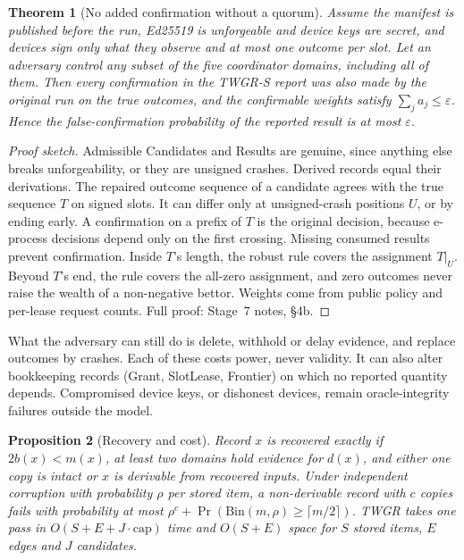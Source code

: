 \documentclass[11pt]{article}
\newtheorem{theorem}{Theorem}
\newtheorem{proposition}[theorem]{Proposition}
\theoremstyle{definition}
\begin{document}
\begin{theorem}[No added confirmation without a quorum]\label{thm:twgrs}
Assume the manifest is published before the run, Ed25519 is unforgeable and device keys are secret, and devices sign only what they observe and at most one outcome per slot. Let an adversary control any subset of the five coordinator domains, including all of them. Then every confirmation in the TWGR-S report was also made by the original run on the true outcomes, and the confirmable weights satisfy $\sum_j a_j\le\varepsilon$. Hence the false-confirmation probability of the reported result is at most $\varepsilon$.
\end{theorem}
\begin{proof}[Proof sketch]
Admissible Candidates and Results are genuine, since anything else breaks unforgeability, or they are unsigned crashes. Derived records equal their derivations. The repaired outcome sequence of a candidate agrees with the true sequence $T$ on signed slots. It can differ only at unsigned-crash positions $U$, or by ending early. A confirmation on a prefix of $T$ is the original decision, because e-process decisions depend only on the first crossing. Missing consumed results prevent confirmation. Inside $T$'s length, the robust rule covers the assignment $T|_U$. Beyond $T$'s end, the rule covers the all-zero assignment, and zero outcomes never raise the wealth of a non-negative bettor. Weights come from public policy and per-lease request counts. Full proof: Stage~7 notes, \S4b.
\end{proof}

What the adversary can still do is delete, withhold or delay evidence, and replace outcomes by crashes. Each of these costs power, never validity. It can also alter bookkeeping records (Grant, SlotLease, Frontier) on which no reported quantity depends. Compromised device keys, or dishonest devices, remain oracle-integrity failures outside the model.

\begin{proposition}[Recovery and cost]\label{prop:recovery}
Record $x$ is recovered exactly if $2b(x)<m(x)$, at least two domains hold evidence for $d(x)$, and either one copy is intact or $x$ is derivable from recovered inputs. Under independent corruption with probability $\rho$ per stored item, a non-derivable record with $c$ copies fails with probability at most $\rho^{c}+\Pr(\mathrm{Bin}(m,\rho)\ge\lceil m/2\rceil)$. TWGR takes one pass in $O(S+E+J\cdot\mathrm{cap})$ time and $O(S+E)$ space for $S$ stored items, $E$ edges and $J$ candidates.
\end{proposition}
\end{document}
